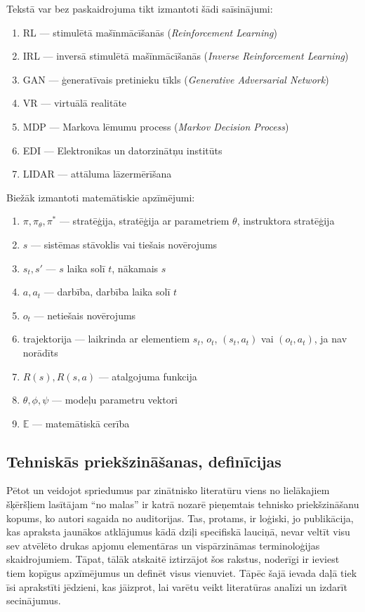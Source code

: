 \documentclass[12pt, a4paper]{article}
\numberwithin{equation}{section} %
\begin{document}
Tekstā var bez paskaidrojuma tikt izmantoti šādi saīsinājumi:

\begin{enumerate}
    \item RL --- stimulētā mašīnmācīšanās (\textit{Reinforcement Learning})
    \item IRL --- inversā stimulētā mašīnmācīšanās (\textit{Inverse Reinforcement Learning})
    \item GAN --- ģeneratīvais pretinieku tīkls (\textit{Generative Adversarial Network})
    \item VR --- virtuālā realitāte
    \item MDP --- Markova lēmumu process (\textit{Markov Decision Process})
    \item EDI --- Elektronikas un datorzinātņu institūts
    \item LIDAR --- attāluma lāzermērīšana
\end{enumerate}

Biežāk izmantoti matemātiskie apzīmējumi:

\begin{enumerate}
    \item $\pi, \pi_{\theta}, \pi^*$ --- stratēģija, stratēģija ar parametriem $\theta$, instruktora stratēģija
    \item $s$ --- sistēmas stāvoklis vai tiešais novērojums
    \item $s_t, s'$ --- $s$ laika solī $t$, nākamais $s$
    \item $a, a_t$ --- darbība, darbība laika solī $t$
    \item $o_t$ --- netiešais novērojums
    \item trajektorija --- laikrinda ar elementiem $s_t$, $o_t$, $(s_t, a_t)$ vai $(o_t, a_t)$, ja nav norādīts
    \item $R(s), R(s,a)$ --- atalgojuma funkcija
    \item $\theta, \phi, \psi$ --- modeļu parametru vektori
    \item $\mathbb{E}$ --- matemātiskā cerība
\end{enumerate}



\subsection{Tehniskās priekšzināšanas, definīcijas}

Pētot un veidojot spriedumus par zinātnisko literatūru viens no lielākajiem šķēršļiem lasītājam ``no malas'' ir katrā nozarē pieņemtais tehnisko priekšzināšanu kopums, ko autori sagaida no auditorijas. Tas, protams, ir loģiski, jo publikācija, kas apraksta jaunākos atklājumus kādā dziļi specifiskā lauciņā, nevar veltīt visu sev atvēlēto drukas apjomu elementāras un vispārzināmas terminoloģijas skaidrojumiem. Tāpat, tālāk atskaitē iztirzājot šos rakstus, noderīgi ir ieviest tiem kopīgus apzīmējumus un definēt visus vienuviet. Tāpēc šajā ievada daļā tiek īsi aprakstīti jēdzieni, kas jāizprot, lai varētu veikt literatūras analīzi un izdarīt secinājumus.
\end{document}
